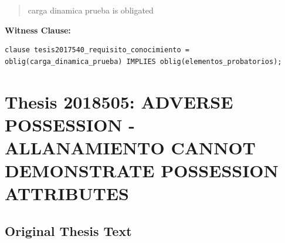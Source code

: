 \documentclass[11pt,a4paper]{article}
\begin{document}
\begin{quote}
carga dinamica prueba is obligated
\end{quote}

\textbf{Witness Clause:}

\begin{lstlisting}[style=witnessstyle, language=Witness]
clause tesis2017540_requisito_conocimiento = oblig(carga_dinamica_prueba) IMPLIES oblig(elementos_probatorios);
\end{lstlisting}

\newpage

\section{Thesis 2018505: ADVERSE POSSESSION - ALLANAMIENTO CANNOT DEMONSTRATE POSSESSION ATTRIBUTES}
\label{thesis:2018505}

\subsection{Original Thesis Text}
\end{document}
